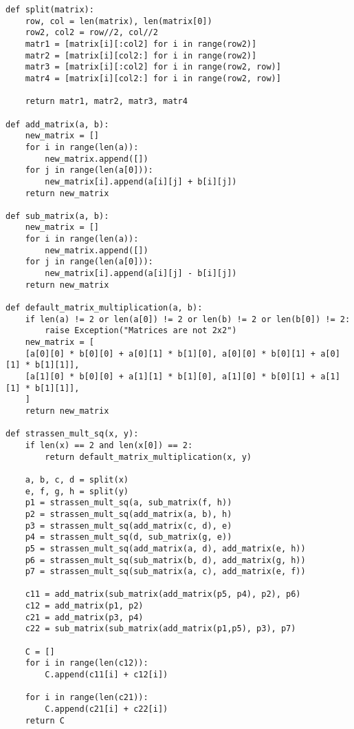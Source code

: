 \begin{center}
\captionsetup{justification=raggedright,singlelinecheck=off}
\begin{lstlisting}[label=lst:strassen,caption=Алгоритм Штрассена умножения матриц]
def split(matrix):
	row, col = len(matrix), len(matrix[0])
	row2, col2 = row//2, col//2
	matr1 = [matrix[i][:col2] for i in range(row2)]
	matr2 = [matrix[i][col2:] for i in range(row2)]
	matr3 = [matrix[i][:col2] for i in range(row2, row)]
	matr4 = [matrix[i][col2:] for i in range(row2, row)]
	
	return matr1, matr2, matr3, matr4 

def add_matrix(a, b):
	new_matrix = []
	for i in range(len(a)):
		new_matrix.append([])
	for j in range(len(a[0])):
		new_matrix[i].append(a[i][j] + b[i][j])
	return new_matrix

def sub_matrix(a, b):
	new_matrix = []
	for i in range(len(a)):
		new_matrix.append([])
	for j in range(len(a[0])):
		new_matrix[i].append(a[i][j] - b[i][j])
	return new_matrix

def default_matrix_multiplication(a, b):
	if len(a) != 2 or len(a[0]) != 2 or len(b) != 2 or len(b[0]) != 2:
		raise Exception("Matrices are not 2x2")
	new_matrix = [
	[a[0][0] * b[0][0] + a[0][1] * b[1][0], a[0][0] * b[0][1] + a[0][1] * b[1][1]],
	[a[1][0] * b[0][0] + a[1][1] * b[1][0], a[1][0] * b[0][1] + a[1][1] * b[1][1]],
	]
	return new_matrix

def strassen_mult_sq(x, y):
	if len(x) == 2 and len(x[0]) == 2:
		return default_matrix_multiplication(x, y)
	
	a, b, c, d = split(x)
	e, f, g, h = split(y)
	p1 = strassen_mult_sq(a, sub_matrix(f, h)) 
	p2 = strassen_mult_sq(add_matrix(a, b), h)	 
	p3 = strassen_mult_sq(add_matrix(c, d), e)	 
	p4 = strassen_mult_sq(d, sub_matrix(g, e))	 
	p5 = strassen_mult_sq(add_matrix(a, d), add_matrix(e, h))	 
	p6 = strassen_mult_sq(sub_matrix(b, d), add_matrix(g, h)) 
	p7 = strassen_mult_sq(sub_matrix(a, c), add_matrix(e, f)) 
	
	c11 = add_matrix(sub_matrix(add_matrix(p5, p4), p2), p6) 
	c12 = add_matrix(p1, p2)		 
	c21 = add_matrix(p3, p4)		 
	c22 = sub_matrix(sub_matrix(add_matrix(p1,p5), p3), p7) 
	
	C = []
	for i in range(len(c12)):
		C.append(c11[i] + c12[i])
	
	for i in range(len(c21)):
		C.append(c21[i] + c22[i])
	return C 
\end{lstlisting}
\end{center}
\clearpage
